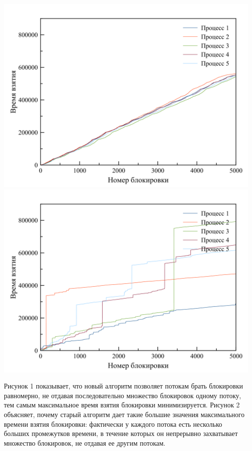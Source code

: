 \includegraphics[width=\textwidth]{5_new.png}
\includegraphics[width=\textwidth]{5_old.png}

Рисунок 1 показывает, что новый алгоритм позволяет потокам брать блокировки равномерно, не отдавая последовательно множество блокировок одному потоку, тем самым максимальное время взятия блокировки минимизируется. Рисунок 2 объясняет, почему старый алгоритм дает такие большие значения максимального времени взятия блокировки: фактически у каждого потока есть несколько больших промежутков времени, в течение которых он непрерывно захватывает множество блокировок, не отдавая ее другим потокам.

